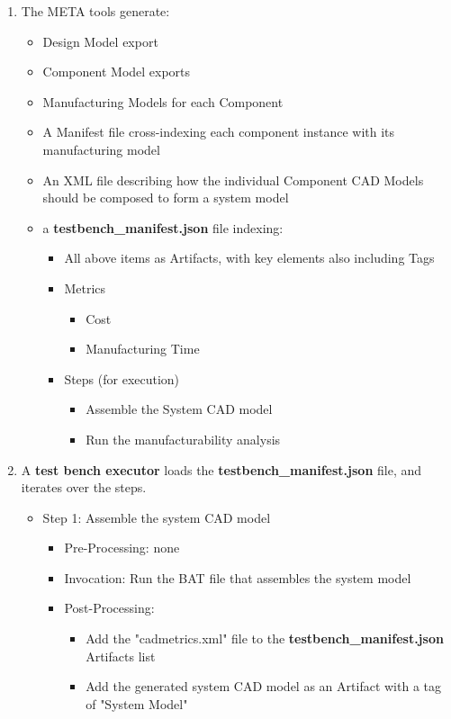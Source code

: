 \documentclass{article}
\begin{document}
\begin{enumerate}
\item The META tools generate:
	\begin{itemize}
	\item Design Model export
	\item Component Model exports
	\item Manufacturing Models for each Component
	\item A Manifest file cross-indexing each component instance with its manufacturing model
	\item An XML file describing how the individual Component CAD Models should be composed to form a system model
	\item a \textbf{testbench\_manifest.json} file indexing:
		\begin{itemize}
		\item All above items as Artifacts, with key elements also including Tags
		\item Metrics
			\begin{itemize}
			\item Cost
			\item Manufacturing Time
			\end{itemize}
		\item Steps (for execution)
			\begin{itemize}
			\item Assemble the System CAD model
			\item Run the manufacturability analysis
			\end{itemize}
		\end{itemize}
	\end{itemize}
\item A \textbf{test bench executor} loads the \textbf{testbench\_manifest.json} file, and iterates over the steps. 
	\begin{itemize}
	\item Step 1: Assemble the system CAD model
		\begin{itemize}
		\item Pre-Processing: none
		\item Invocation: Run the BAT file that assembles the system model
		\item Post-Processing:
			\begin{itemize}
			\item Add the "cadmetrics.xml" file to the \textbf{testbench\_manifest.json} Artifacts list
			\item Add the generated system CAD model as an Artifact with a tag of "System Model"

\end{itemize}
\end{itemize}
\end{itemize}
\end{enumerate}
\end{document}
